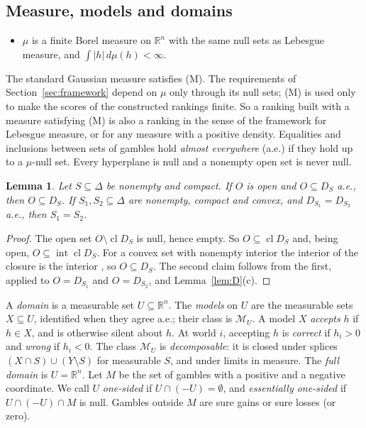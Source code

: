 \documentclass[11pt]{article}
\newcommand{\R}{\mathbb{R}}
\newcommand{\M}{\mathcal{M}}
\DeclareMathOperator{\cl}{cl}
\DeclareMathOperator{\inter}{int}
\theoremstyle{plain}
\newtheorem{lemma}[theorem]{Lemma}
\theoremstyle{definition}
\theoremstyle{remark}
\begin{document}
\subsection{Measure, models and domains}

\begin{itemize}
  \item[(M)] $\mu$ is a finite Borel measure on $\R^n$ with the same null sets as Lebesgue
  measure, and $\int|h|\,d\mu(h)<\infty$.
\end{itemize}
The standard Gaussian measure satisfies (M). The requirements of
Section~\ref{sec:framework} depend on $\mu$ only through its null sets; (M) is used only to
make the scores of the constructed rankings finite. So a ranking built with a measure
satisfying (M) is also a ranking in the sense of the framework for Lebesgue measure, or
for any measure with a positive density. Equalities and inclusions between sets of
gambles hold \emph{almost everywhere} (a.e.) if they hold up to a $\mu$-null set. Every
hyperplane is null and a nonempty open set is never null.

\begin{lemma}\label{lem:open}
Let $S\subseteq\Delta$ be nonempty and compact. If $O$ is open and $O\subseteq D_S$
a.e., then $O\subseteq D_S$. If $S_1,S_2\subseteq\Delta$ are nonempty, compact and
convex, and $D_{S_1}=D_{S_2}$ a.e., then $S_1=S_2$.
\end{lemma}

\begin{proof}
The open set $O\setminus\cl D_S$ is null, hence empty. So $O\subseteq\cl D_S$ and, being
open, $O\subseteq\inter\cl D_S$. For a convex set with nonempty interior the interior of
the closure is the interior \cite[Thm.~6.3]{Rockafellar}, so $O\subseteq D_S$. The second %
claim follows from the first, applied to $O=D_{S_1}$ and $O=D_{S_2}$, and
Lemma~\ref{lem:D}(c).
\end{proof}

A \emph{domain} is a measurable set $U\subseteq\R^n$. The \emph{models} on $U$ are the
measurable sets $X\subseteq U$, identified when they agree a.e.; their class is $\M_U$. A
model $X$ \emph{accepts} $h$ if $h\in X$, and is otherwise silent about $h$. At world $i$,
accepting $h$ is \emph{correct} if $h_i>0$ and \emph{wrong} if $h_i<0$. The class $\M_U$ is
\emph{decomposable}: it is closed under splices $(X\cap S)\cup(Y\setminus S)$ for measurable
$S$, and under limits in measure. The \emph{full domain} is $U=\R^n$. Let $M$ be the set of
gambles with a positive and a negative coordinate. We call $U$ \emph{one-sided} if
$U\cap(-U)=\emptyset$, and \emph{essentially one-sided} if $U\cap(-U)\cap M$ is null.
Gambles outside $M$ are sure gains or sure losses (or zero).
\end{document}

